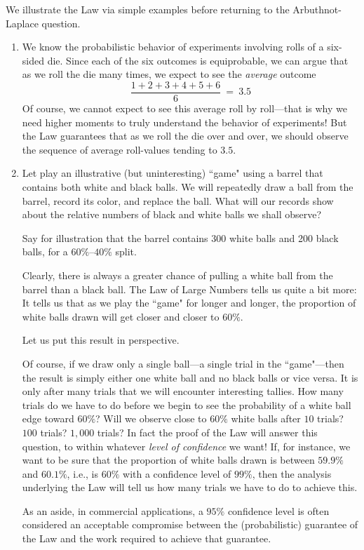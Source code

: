 \medskip

We illustrate the Law via simple examples before returning to the Arbuthnot-Laplace question.

\begin{enumerate}
\item
We know the probabilistic behavior of experiments involving rolls of a six-sided die.  Since each of the six outcomes is equiprobable, we can argue that as we roll the die many times, we expect to see the {\em average} outcome
\[ \frac{1+2+3+4+5+6}{6} \ = \ 3.5 \]
Of course, we cannot expect to see this average roll by roll---that is why we need higher moments to truly understand the behavior of experiments!  But the Law guarantees that as we roll the die over and over, we should observe the sequence of average roll-values tending to $3.5$.

\medskip\item
Let play an illustrative (but uninteresting) ``game" using a barrel that contains both white and black balls.  We will repeatedly draw a ball from the barrel, record its color, and replace the ball.  What will our records show about the relative numbers of black and white balls we shall observe?

\smallskip

Say for illustration that the barrel contains 300 white balls and 200 black balls, for a $60\%$--$40\%$ split.

\smallskip

Clearly, there is always a greater chance of pulling a white ball from the barrel than a black ball.  The Law of Large Numbers tells us quite a bit more:  It tells us that as we play the ``game" for longer and longer, the proportion of white balls drawn will get closer and closer to $60\%$.

\medskip

Let us put this result in perspective.

\smallskip

Of course, if we draw only a single ball---a single trial in the ``game"---then the result is simply either one white ball and no black balls or vice versa.  It is only after many trials that we will encounter interesting tallies. How many trials do we have to do before we begin to see the probability of a white ball edge toward $60\%$?  Will we observe close to $60\%$ white balls after $10$ trials? $100$ trials? $1,000$ trials?  In fact the proof of the Law will answer this question, to within whatever {\it level of confidence} we want!  If, for instance, we want to be sure 
that the proportion of white balls drawn is between $59.9\%$ and $60.1\%$, i.e., is $60\%$ with a confidence level of $99\%$, then the analysis underlying the Law will tell us how many trials we have to do to achieve this.


\smallskip

As an aside, in commercial applications, a $95\%$ confidence level is often considered an acceptable compromise between the (probabilistic) guarantee of the Law and the work required to achieve that guarantee.
\end{enumerate}

